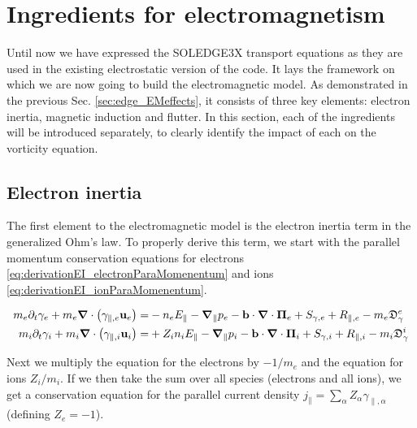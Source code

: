 \section{Ingredients for electromagnetism}
\label{sec:S3X_electromagneticModel}

Until now we have expressed the SOLEDGE3X transport equations as they are used in the existing electrostatic version of the code. It lays the framework on which we are now going to build the electromagnetic model. As demonstrated in the previous Sec. \ref{sec:edge_EMeffects}, it consists of three key elements: electron inertia, magnetic induction and flutter. In this section, each of the ingredients will be introduced separately, to clearly identify the impact of each on the vorticity equation. 


\subsection{Electron inertia}
\label{ssec:ModelElectronInertia}


The first element to the electromagnetic model is the electron inertia term in the generalized Ohm's law. To properly derive this term, we start with the parallel momentum conservation equations for electrons \ref{eq:derivationEI_electronParaMomenentum} and ions \ref{eq:derivationEI_ionParaMomenentum}.

\begin{align}
	m_e\partial_t \gamma_{e} + m_e\grad\cdot\left(\gamma_{\parallel,e}\mathbf{u}_e\right) =& -n_eE_\parallel -\grad_\parallel{p_e} - \mathbf{b}\cdot\grad\cdot\boldsymbol{\Pi}_e + S_{\gamma,e} + R_{\parallel,e} - m_e\mathfrak{D}_\gamma^e \label{eq:derivationEI_electronParaMomenentum} \\
	m_i\partial_t \gamma_{i} + m_i\grad\cdot\left(\gamma_{\parallel,i}\mathbf{u}_i\right) =& + Z_in_iE_\parallel -\grad_\parallel{p_i} - \mathbf{b}\cdot\grad\cdot\boldsymbol{\Pi}_i + S_{\gamma,i} + R_{\parallel,i} - m_i\mathfrak{D}_\gamma^i \label{eq:derivationEI_ionParaMomenentum}
\end{align}

Next we multiply the equation for the electrons by $-1/m_e$ and the equation for ions $Z_i/m_i$. If we then take the sum over all species (electrons and all ions), we get a conservation equation for the parallel current density $j_\parallel = \sum_{\alpha} Z_\alpha \gamma_{\parallel,\alpha} $ (defining $Z_e = -1$).

